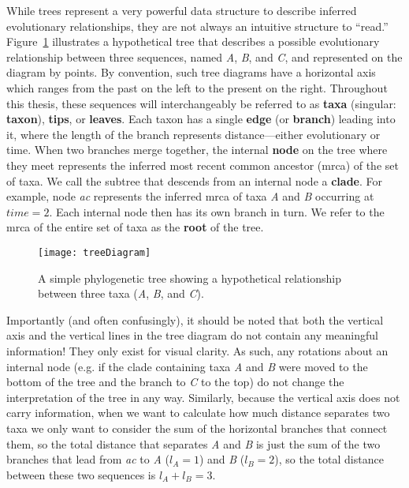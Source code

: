 While trees represent a very powerful data structure to describe inferred evolutionary relationships, they are not always an intuitive structure to ``read.''
Figure~\ref{fig:treeDiagram} illustrates a hypothetical tree that describes a possible evolutionary relationship between three sequences, named \textit{A}, \textit{B}, and \textit{C}, and represented on the diagram by points.
By convention, such tree diagrams have a horizontal axis which ranges from the past on the left to the present on the right.
Throughout this thesis, these sequences will interchangeably be referred to as \textbf{taxa} (singular: \textbf{taxon}), \textbf{tips}, or \textbf{leaves}.
Each taxon has a single \textbf{edge} (or \textbf{branch}) leading into it, where the length of the branch represents distance---either evolutionary or time.
When two branches merge together, the internal \textbf{node} on the tree where they meet represents the inferred most recent common ancestor (\gls{mrca}) of the set of taxa.
We call the subtree that descends from an internal node a \textbf{clade}.
For example, node \textit{ac} represents the inferred \gls{mrca} of taxa \textit{A} and \textit{B} occurring at $time=2$.
Each internal node then has its own branch in turn.
We refer to the \gls{mrca} of the entire set of taxa as the \textbf{root} of the tree. 

\begin{figure}[ht]
  \centering
  \texttt{[image: treeDiagram]}
  \caption[Example phylogenetic tree]{A simple phylogenetic tree showing a hypothetical relationship between three taxa (\textit{A}, \textit{B}, and \textit{C}).
  }
  \label{fig:treeDiagram}
\end{figure}

Importantly (and often confusingly), it should be noted that both the vertical axis and the vertical lines in the tree diagram do not contain any meaningful information!
They only exist for visual clarity.
As such, any rotations about an internal node (e.g. if the clade containing taxa \textit{A} and \textit{B} were moved to the bottom of the tree and the branch to \textit{C} to the top) do not change the interpretation of the tree in any way.
Similarly, because the vertical axis does not carry information, when we want to calculate how much distance separates two taxa we only want to consider the sum of the horizontal branches that connect them, so the total distance that separates \textit{A} and \textit{B} is just the sum of the two branches that lead from \textit{ac} to \textit{A} ($l_A=1$) and \textit{B} ($l_B=2$), so the total distance between these two sequences is $l_A + l_B = 3$.

